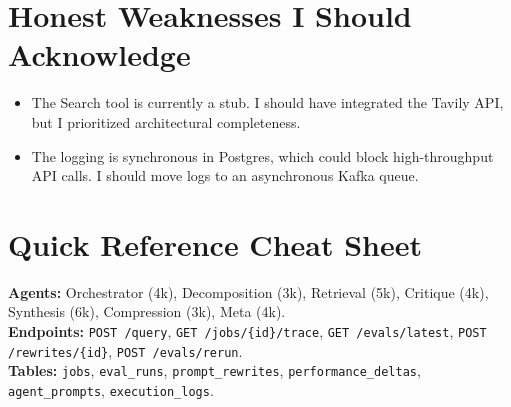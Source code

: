 \documentclass[11pt]{article}
\begin{document}
\section{Honest Weaknesses I Should Acknowledge}
\begin{itemize}
    \item The Search tool is currently a stub. I should have integrated the Tavily API, but I prioritized architectural completeness.
    \item The logging is synchronous in Postgres, which could block high-throughput API calls. I should move logs to an asynchronous Kafka queue.
\end{itemize}

\section{Quick Reference Cheat Sheet}
\textbf{Agents:} Orchestrator (4k), Decomposition (3k), Retrieval (5k), Critique (4k), Synthesis (6k), Compression (3k), Meta (4k).\\
\textbf{Endpoints:} \texttt{POST /query}, \texttt{GET /jobs/\{id\}/trace}, \texttt{GET /evals/latest}, \texttt{POST /rewrites/\{id\}}, \texttt{POST /evals/rerun}.\\
\textbf{Tables:} \texttt{jobs}, \texttt{eval\_runs}, \texttt{prompt\_rewrites}, \texttt{performance\_deltas}, \texttt{agent\_prompts}, \texttt{execution\_logs}.
\end{document}
